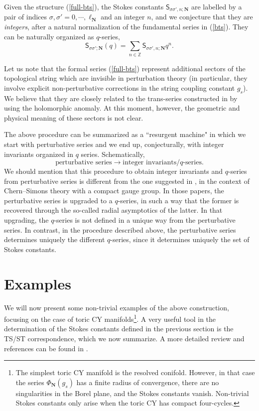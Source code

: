 \documentclass[a4paper,11pt]{article}
\theoremstyle{definition}
\def\IZ{{\mathbb Z}}
\newcommand{\mS}{\mathsf{S}}
\def\bN{{\boldsymbol{N}}}
\newcommand{\be}{\begin{equation}}
\newcommand{\ee}{\end{equation}}
\begin{document}
Given the structure (\ref{full-bts}), the Stokes constants $\mS_{\sigma \sigma', n; \bN}$ are labelled by a pair of indices $\sigma, \sigma' =0, \cdots, \ell_{\bN}$ and an integer $n$, and we conjecture that they are {\it integers}, after a 
natural normalization of the fundamental series in (\ref{bts}). They can be naturally organized as $q$-series, 
%
\be
\mS_{\sigma \sigma'; \bN}(q)= \sum_{n \in \IZ} \mS_{\sigma \sigma', n; \bN} q^n. \label{eq:Sqn}
\ee
%

Let us note that the formal series (\ref{full-bts}) represent 
additional sectors of the topological string which are invisible in perturbation theory (in particular, they 
involve explicit non-perturbative corrections in the string coupling constant $g_s$). 
We believe that they are closely related to the trans-series constructed in \cite{cesv1,cesv2} by using the holomorphic anomaly. At this moment, 
however, the geometric and physical meaning of these sectors is not clear. 

The above procedure can be summarized as a ``resurgent machine" in which we start with perturbative series and we end up, conjecturally, with 
integer invariants organized in $q$ series. Schematically, 
%
\be
\text{perturbative series} \longrightarrow \text{integer invariants/$q$-series}. 
\ee
%
We should mention that this procedure to obtain integer invariants and $q$-series from perturbative series is 
different from the one suggested in \cite{lz,hikami1, hikami-dec, gpv, gmp, gppv,andersen}, in the context of 
Chern--Simons theory with a compact gauge group. In those papers, the perturbative series is 
upgraded to a $q$-series, in such a way that the former is recovered 
through the so-called radial asymptotics of the latter. In that upgrading, the $q$-series is not defined in a unique way 
from the perturbative series. In contrast, in the procedure described above, the perturbative series determines uniquely the different
$q$-series, since it determines uniquely the set of Stokes constants.  

\section{Examples}
\label{sec-ex}
We will now present some non-trivial examples of the above construction, focusing on the case of toric CY manifolds\footnote{The simplest toric CY manifold is the resolved conifold. However, in that case the series $\Phi_{\bN}(g_s)$ has a finite radius of convergence, there are no singularities in the Borel plane, and the Stokes constants vanish. Non-trivial Stokes constants only arise when the toric CY has compact four-cycles.}. 
A very useful tool in the determination of the Stokes constants defined in the previous section is the TS/ST correspondence, which we now summarize. A more detailed review and references can be found in \cite{mmrev}. 
\end{document}
